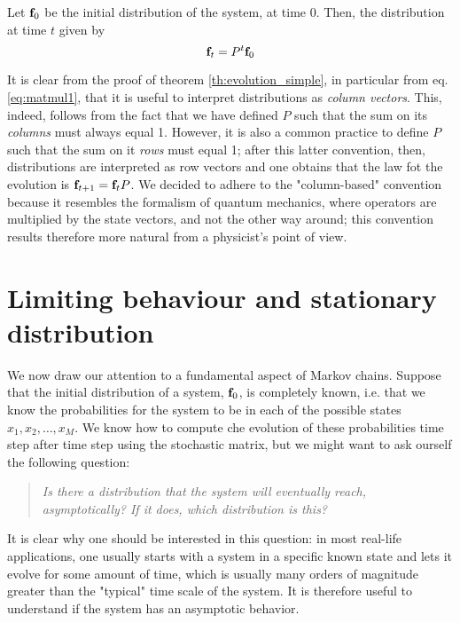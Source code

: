 \begin{corollary} \label{th:evolution_complete}
    Let $\mathbf{f}_0$ be the initial distribution of the system, at time 0. Then, the distribution at time $t$ given by
    \begin{equation}
        \mathbf{f}_t = P^t \mathbf{f}_0
    \end{equation}
\end{corollary}

\begin{remark}
    It is clear from the proof of theorem \ref{th:evolution_simple}, in particular from eq. \ref{eq:matmul1}, that it is useful to interpret distributions as \emph{column vectors}. This, indeed, follows from the fact that we have defined $P$ such that the sum on its \emph{columns} must always equal 1. However, it is also a common practice to define $P$ such that the sum on it \emph{rows} must equal 1; after this latter convention, then, distributions are interpreted as row vectors and one obtains that the law fot the evolution is $\mathbf{f}_{t+1} = \mathbf{f}_t P$. We decided to adhere to the "column-based" convention because it resembles the formalism of quantum mechanics, where operators are multiplied by the state vectors, and not the other way around; this convention results therefore more natural from a physicist's point of view.
\end{remark}

\section{Limiting behaviour and stationary distribution}
We now draw our attention to a fundamental aspect of Markov chains. Suppose that the initial distribution of a system, $\mathbf{f}_0$, is completely known, i.e. that we know the probabilities for the system to be in each of the possible states $x_1, x_2, \dots, x_M$. We know how to compute che evolution of these probabilities time step after time step using the stochastic matrix, but we might want to ask ourself the following question: 
\begin{quote}
    \emph{Is there a distribution that the system will eventually reach, asymptotically? If it does, which distribution is this?}
\end{quote}

It is clear why one should be interested in this question: in most real-life applications, one usually starts with a system in a specific known state and lets it evolve for some amount of time, which is usually many orders of magnitude greater than the "typical" time scale of the system. It is therefore useful to understand if the system has an asymptotic behavior.


